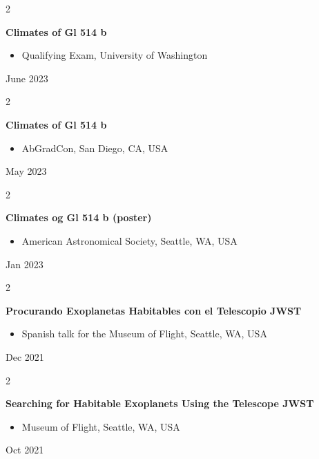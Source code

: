 \documentclass[10pt, letterpaper]{article}
\newenvironment{highlights}{
    \begin{itemize}[
        topsep=0.10 cm,
        parsep=0.10 cm,
        partopsep=0pt,
        itemsep=0pt,
        leftmargin=0.4 cm + 10pt
    ]
}{
    \end{itemize}
} %
\newenvironment{twocolentry}[2][]{
    \onecolentry
    \def\secondColumn{#2}
    \setcolumnwidth{\fill, 4.5 cm}
    \begin{paracol}{2}
}{
    \switchcolumn \raggedleft \secondColumn
    \end{paracol}
    \endonecolentry
} %
\begin{document}
        \begin{twocolentry}{
            June 2023
        }
            \textbf{Climates of Gl 514 b}
            \begin{highlights}
                \item Qualifying Exam, University of Washington
            \end{highlights}
        \end{twocolentry}


        \vspace{0.2 cm}

        \begin{twocolentry}{
            May 2023
        }
            \textbf{Climates of Gl 514 b}
            \begin{highlights}
                \item AbGradCon, San Diego, CA, USA
            \end{highlights}
        \end{twocolentry}


        \vspace{0.2 cm}

        \begin{twocolentry}{
            Jan 2023
        }
            \textbf{Climates og Gl 514 b (poster)}
            \begin{highlights}
                \item American Astronomical Society, Seattle, WA, USA
            \end{highlights}
        \end{twocolentry}


        \vspace{0.2 cm}

        \begin{twocolentry}{
            Dec 2021
        }
            \textbf{Procurando Exoplanetas Habitables con el Telescopio JWST}
            \begin{highlights}
                \item Spanish talk for the Museum of Flight, Seattle, WA, USA
            \end{highlights}
        \end{twocolentry}


        \vspace{0.2 cm}

        \begin{twocolentry}{
            Oct 2021
        }
            \textbf{Searching for Habitable Exoplanets Using the Telescope JWST}
            \begin{highlights}
                \item Museum of Flight, Seattle, WA, USA
            \end{highlights}
        \end{twocolentry}
\end{document}
